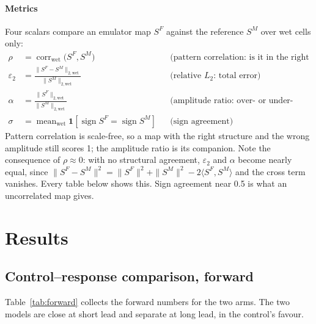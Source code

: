 \documentclass[3p,12pt]{elsarticle}
\begin{document}
\paragraph{Metrics} Four scalars compare an emulator map $S^{F}$ against the
reference $S^{M}$ over wet cells only:
\begin{align}
\rho &= \operatorname{corr}_{\mathrm{wet}}\bigl(S^{F},S^{M}\bigr)
&&\text{(pattern correlation: is it in the right places?)}\label{eq:corr}\\
\varepsilon_{2} &= \frac{\|S^{F}-S^{M}\|_{2,\mathrm{wet}}}{\|S^{M}\|_{2,\mathrm{wet}}}
&&\text{(relative $L_2$: total error)}\label{eq:rel}\\
\alpha &= \frac{\|S^{F}\|_{2,\mathrm{wet}}}{\|S^{M}\|_{2,\mathrm{wet}}}
&&\text{(amplitude ratio: over- or under-response)}\label{eq:amp}\\
\sigma &= \operatorname{mean}_{\mathrm{wet}}\mathbf{1}\!\left[\operatorname{sign}S^{F}=\operatorname{sign}S^{M}\right]
&&\text{(sign agreement)}\label{eq:sign}
\end{align}
Pattern correlation is scale-free, so a map with the right structure and the
wrong amplitude still scores 1; the amplitude ratio is its companion. Note the
consequence of $\rho\approx0$: with no structural agreement, $\varepsilon_2$ and
$\alpha$ become nearly equal, since
$\|S^F-S^M\|^2=\|S^F\|^2+\|S^M\|^2-2\langle S^F,S^M\rangle$ and the cross term
vanishes. Every table below shows this. Sign agreement near 0.5 is what an
uncorrelated map gives.

\section{Results}
\label{sec:results}

\subsection{Control--response comparison, forward}
\label{sec:forward}

Table~\ref{tab:forward} collects the forward numbers for the two arms. The two
models are close at short lead and separate at long lead, in the control's
favour.
\end{document}
